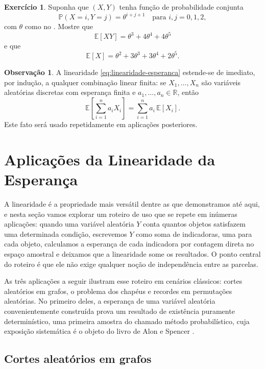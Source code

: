 \documentclass[12pt,portuguese]{article}
\theoremstyle{definition}
\newtheorem{remark}[remark]{Observação}
\newtheorem{exercise}{Exercício}
\begin{document}
\begin{exercise}\label{exercise:esperanca-theta-0-1-2}
Suponha que $(X, Y)$ tenha função de probabilidade conjunta
\[
  \mathbb{P}(X = i, Y = j) = \theta^{i+j+1} \quad \text{para } i, j = 0, 1, 2,
\]
com $\theta$ como no .
Mostre que
\[
  \mathbb{E}[XY] = \theta^3 + 4\theta^4 + 4\theta^5
\]
e que
\[
  \mathbb{E}[X] = \theta^2 + 3\theta^3 + 3\theta^4 + 2\theta^5.
\]
\end{exercise}

\begin{remark}\label{rem:esperanca-linearidade-extensao}
A linearidade \eqref{eq:linearidade-esperanca} estende-se de imediato, por
indução, a qualquer combinação linear finita: se
$X_1,\dots,X_n$ são variáveis aleatórias discretas com esperança finita e
$a_1,\dots,a_n\in\mathbb{R}$, então
$$\mathbb{E}\left[\sum_{i=1}^n a_i X_i\right]=\sum_{i=1}^n a_i\, \mathbb{E}[X_i].$$
Este fato será usado repetidamente em aplicações posteriores.
\end{remark}

\section{Aplicações da Linearidade da Esperança}
\label{sec:aplicacoes-linearidade}

A linearidade é a propriedade mais versátil dentre as que demonstramos até
aqui, e nesta seção vamos explorar um roteiro de uso que se repete em inúmeras
aplicações: quando uma variável aleatória $Y$ conta quantos objetos satisfazem
uma determinada condição, escrevemos $Y$ como soma de indicadoras, uma para
cada objeto, calculamos a esperança de cada indicadora por contagem direta no
espaço amostral e deixamos que a linearidade some os resultados. O ponto
central do roteiro é que ele não exige qualquer noção de independência entre
as parcelas.

As três aplicações a seguir ilustram esse roteiro em cenários clássicos: cortes
aleatórios em grafos, o problema dos chapéus e recordes em permutações
aleatórias. No primeiro deles, a esperança de uma variável aleatória
convenientemente construída prova um resultado de existência puramente
determinístico, uma primeira amostra do chamado método probabilístico, cuja
exposição sistemática é o objeto do livro de Alon e Spencer
\cite{AlonSpencer2016}.

\bigskip

\subsection{Cortes aleatórios em grafos}\label{subsec:cortes-aleatorios}
\end{document}

